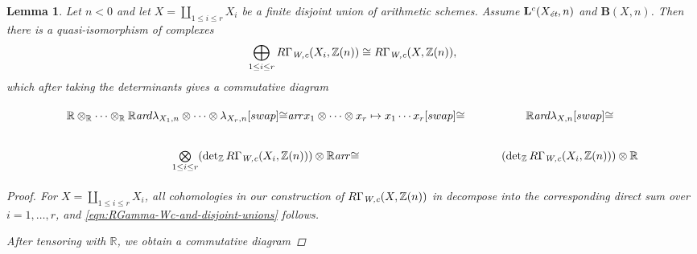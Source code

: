 \documentclass[10pt,a4paper,oneside,draft]{article}
\newcommand{\RR}{\mathbb{R}}
\newcommand{\ZZ}{\mathbb{Z}}
\renewcommand{\det}{\operatorname{det}}
\newcommand{\ar}{\text{\it ar}}
\newcommand{\et}{\text{\it \'{e}t}}
\newcommand{\Wc}{\text{\it W,c}}
\theoremstyle{myplain}
\newtheorem{lemma}[theorem]{Lemma}
\theoremstyle{mydefinition}
\numberwithin{equation}{section}
\begin{document}
\begin{lemma}
  \label{lemma:lambda-and-disjoint-unions}
  Let $n < 0$ and let $X = \coprod_{1 \le i \le r} X_i$ be a finite disjoint
  union of arithmetic schemes. Assume $\mathbf{L}^c (X_\et,n)$ and
  $\mathbf{B} (X,n)$. Then there is a quasi-isomorphism of complexes
  \begin{equation}
    \label{eqn:RGamma-Wc-and-disjoint-unions}
    \bigoplus_{1 \le i \le r} R\Gamma_\Wc (X_i, \ZZ(n)) \cong
    R\Gamma_\Wc (X, \ZZ(n)),
  \end{equation}
  which after taking the determinants gives a commutative diagram

  \begin{equation}
    \label{eqn:lambda-and-disjoint-unions}
    \begin{tikzcd}
      \RR \otimes_\RR \cdots \otimes_\RR \RR\ar{d}{\lambda_{X_1,n}\otimes\cdots\otimes\lambda_{X_r,n}}[swap]{\cong} \ar{r}{x_1\otimes\cdots\otimes x_r \mapsto x_1\cdots x_r}[swap]{\cong} & \RR \ar{d}{\lambda_{X,n}}[swap]{\cong} \\
      \bigotimes\limits_{1 \le i \le r} (\det_\ZZ R\Gamma_\Wc (X_i, \ZZ(n))) \otimes \RR \ar{r}{\cong} & (\det_\ZZ R\Gamma_\Wc (X_i, \ZZ(n))) \otimes \RR
    \end{tikzcd}
  \end{equation}

  \begin{proof}
    For $X = \coprod_{1 \le i \le r} X_i$, all cohomologies in our construction
    of $R\Gamma_\Wc (X, \ZZ(n))$ in \cite{Beshenov-Weil-etale-1} decompose into
    the corresponding direct sum over $i = 1,\ldots,r$, and
    \eqref{eqn:RGamma-Wc-and-disjoint-unions} follows.

    After tensoring with $\RR$, we obtain a commutative diagram


\end{proof}
\end{lemma}
\end{document}
